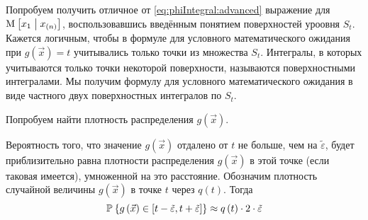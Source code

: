 Попробуем получить отличное от \eqref{eq:phiIntegral:advanced} выражение
для $\operatorname{M}_{} \left[ x_1 \;\middle|\; x_{\left( n \right)} \right]$, воспользовавшись введённым
понятием поверхностей уроовня $S_t$.
Кажется логичным, чтобы в формуле для условного математического ожидания
при $g\left( \vec{x} \right) = t$ учитывались только точки из множества
$S_t$.
Интегралы, в которых учитываются только точки некоторой поверхности, называются
поверхностными интегралами.
Мы получим формулу для условного математического ожидания в виде частного двух
поверхностных интегралов по $S_t$.

Попробуем найти плотность распределения $g\left( \vec{x} \right)$.

Вероятность того, что значение $g\left( \vec{x} \right)$
отдалено от $t$ не больше, чем на $\tilde{\varepsilon}$,
будет приблизительно равна плотности распределения $g\left( \vec{x} \right)$
в этой точке (если таковая имеется),
умноженной на это расстояние.
Обозначим плотность случайной величины $g\left( \vec{x} \right)$
в точке $t$ через $q\left( t \right)$. Тогда
$$\mathbb{P}_{{}}\left\{ g\left( \vec{x} \right)
  \in \left[t-\tilde{\varepsilon}, t+ \tilde{\varepsilon}\right] \right\}
  \approx q\left( t \right) \cdot 2 \cdot \tilde{\varepsilon}$$

\begin{comment}
Вернёмся к раздутию. Помним, что $\varepsilon$ --- расстояние от
точки $\vec{u}$ до ближайшей к нему точки кокона, а также то,
что это расстояние должно быть обратно пропорционально
стремительности изменения уровней в этой окрестности.
Понимаем, что нам необходима численная мера этой скорости.
Под описание такой величины прекрасно подходит модуль градиента.
Поскольку значение $g\left( \vec{x} \right)$ не меняется вдоль поверхности $S_t$
и равно $t$, то градиент будет направлен по нормали к данной точке поверхности.

Норма градиента --- отношение прироста функции к приросту координат.
Нас интересует прирост координат $\varepsilon$ в окрестности точки $\vec{u}$,
мы располагаем приростом функции $\tilde{\varepsilon}$
и нормой градиента
$\left\| \vec{\nabla} \cdot {g\left( \vec{u} \right)} \right\|$.
Напрашивается формула
\begin{equation}\label{widthEpsilon}
  \varepsilon \approx \frac{\tilde{\varepsilon}}
      {\left\| \vec{\nabla} \cdot g\left( \vec{u} \right) \right\|}
\end{equation}

Обозначим раздутие поверхности $S_t$ как $G_{\tilde{\varepsilon}}$,
тогда вероятность попадания значения $g\left( \vec{x} \right)$ в коридорчик
ширины $\tilde{\varepsilon}$ будет приблизительно равно интегралу
плотности распределения вектора $\vec{x}$ по этому коридорчику

$$\Probability{g\left( \vec{x} \right)
  \in \left[t-\tilde{\varepsilon}, t+ \tilde{\varepsilon}\right]}
  \approx q\left( t \right) \cdot 2 \cdot \tilde{\varepsilon}
  \approx \integrall{G_{\tilde{\varepsilon}}}{d\vec{u}}{\pdf{\vec{u}}}$$
\end{comment}

